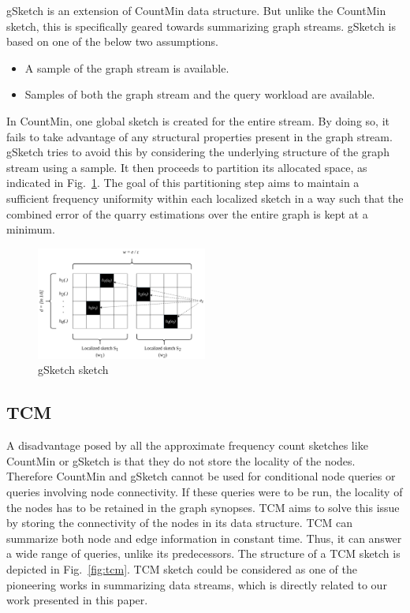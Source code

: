 gSketch\cite{zhao_gsketch:_2011} is an extension of CountMin data structure. But unlike the CountMin sketch, this is specifically geared towards summarizing graph streams. gSketch is based on one of the below two assumptions.

\begin{itemize}
    \item A sample of the graph stream is available.
    \item Samples of both the graph stream and the query workload are available.
\end{itemize}

In CountMin, one global sketch is created for the entire stream. By doing so, it fails to take advantage of any structural properties present in the graph stream. gSketch tries to avoid this by considering the underlying structure of the graph stream using a sample. It then proceeds to partition its allocated space, as indicated in Fig.~\ref{fig:gsketch}. The goal of this partitioning step aims to maintain a sufficient frequency uniformity within each localized sketch in a way such that the combined error of the quarry estimations over the entire graph is kept at a minimum.

\begin{figure}[htbp]
    \centerline{\includegraphics[width=0.5\textwidth]{img/gsketch.png}}
    \caption{gSketch sketch}
    \label{fig:gsketch}
\end{figure}

\subsection{TCM}

A disadvantage posed by all the approximate frequency count sketches like CountMin or gSketch is that they do not store the locality of the nodes. Therefore CountMin and gSketch cannot be used for conditional node queries or queries involving node connectivity. If these queries were to be run, the locality of the nodes has to be retained in the graph synopses. TCM\cite{tang_graph_2016} aims to solve this issue by storing the connectivity of the nodes in its data structure. TCM can summarize both node and edge information in constant time. Thus, it can answer a wide range of queries, unlike its predecessors. The structure of a TCM sketch is depicted in Fig.~\ref{fig:tcm}. TCM sketch could be considered as one of the pioneering works in summarizing data streams, which is directly related to our work presented in this paper.

